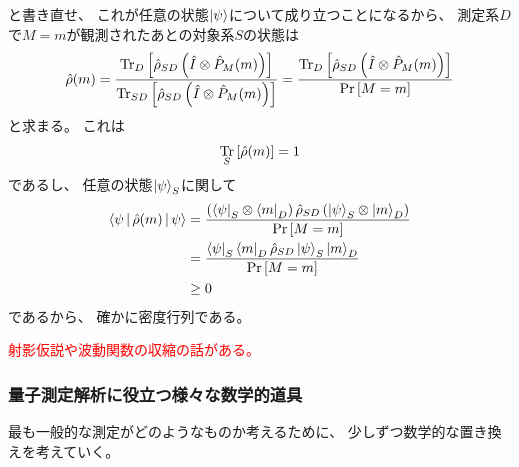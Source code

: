 \documentclass[a4paper, 10pt, uplatex]{jsarticle}
\begin{document}
と書き直せ、
これが任意の状態$\Ket{\psi}$について成り立つことになるから、
測定系$D$で$M = m$が観測されたあとの対象系$S$の状態は
\begin{align}
	\hat{\rho} (m)
	= \frac{\operatorname*{Tr}_D \left[ \hat{\rho}_{SD}
	\left( \hat{I} \otimes \hat{P}_M (m) \right) \right]}
	{\operatorname*{Tr}_{SD} \left[ \hat{\rho}_{SD}
	\left( \hat{I} \otimes \hat{P}_M (m) \right) \right]}
	= \frac{\operatorname*{Tr}_D \left[ \hat{\rho}_{SD}
	\left( \hat{I} \otimes \hat{P}_M (m) \right) \right]}
	{\Pr \left[ M = m \right]}
	\label{eq:測定後状態}
\end{align}
と求まる。
これは
\begin{align}
	\operatorname*{Tr}_S \left[ \hat{\rho} (m) \right] = 1
\end{align}
であるし、
任意の状態$\Ket{\psi}_S$に関して
\begin{align}
	\Braket{\psi | \hat{\rho} (m) | \psi}
	&= \frac{\left( \Bra{\psi}_S \otimes \Bra{m}_D \right)
	\hat{\rho}_{SD} \left( \Ket{\psi}_S \otimes \Ket{m}_D \right)}
	{\Pr \left[ M = m \right]} \\
	&= \frac{\Bra{\psi}_S \Bra{m}_D \hat{\rho}_{SD}
	\Ket{\psi}_S \Ket{m}_D}{\Pr \left[ M = m \right]} \\
	&\geq 0
\end{align}
であるから、
確かに密度行列である。

\textcolor{red}{射影仮説や波動関数の収縮の話がある。}

\setcounter{subsubsection}{2}
\subsubsection{量子測定解析に役立つ様々な数学的道具}
最も一般的な測定がどのようなものか考えるために、
少しずつ数学的な置き換えを考えていく。
\end{document}

